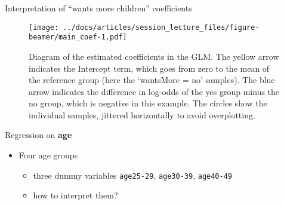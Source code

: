 \documentclass[
  ignorenonframetext,
]{beamer}
\providecommand{\tightlist}{%
  \setlength{\itemsep}{0pt}\setlength{\parskip}{0pt}}
\begin{document}
\begin{frame}{Interpretation of ``wants more children'' coefficients}
\protect\hypertarget{interpretation-of-wants-more-children-coefficients}{}

\tiny

\begin{figure}
\centering
\texttt{[image: ../docs/articles/session\_lecture\_files/figure-beamer/main\_coef-1.pdf]}
\caption{Diagram of the estimated coefficients in the GLM. The yellow
arrow indicates the Intercept term, which goes from zero to the mean of
the reference group (here the `wantsMore = no' samples). The blue arrow
indicates the difference in log-odds of the yes group minus the no
group, which is negative in this example. The circles show the
individual samples, jittered horizontally to avoid overplotting.}
\end{figure}

\end{frame}

\begin{frame}[fragile]{Regression on \textbf{age}}
\protect\hypertarget{regression-on-age}{}

\begin{itemize}
\tightlist
\item
  Four age groups

  \begin{itemize}
  \tightlist
  \item
    three dummy variables \texttt{age25-29}, \texttt{age30-39},
    \texttt{age40-49}
  \item
    how to interpret them?
  \end{itemize}
\end{itemize}

\end{frame}
\end{document}
